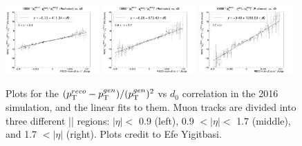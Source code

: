 \begin{figure}[!htb]
      \centering
      \captionsetup{justification=justified}
      \includegraphics[width=0.32\textwidth]{pics/muon_corr/GeoFit/fit_results/2016_DY_eta_0_0p9_dRelPt2p0_Roch.png}
      \includegraphics[width=0.32\textwidth]{pics/muon_corr/GeoFit/fit_results/2016_DY_eta_0p9_1p7_dRelPt2p0_Roch.png}
      \includegraphics[width=0.32\textwidth]{pics/muon_corr/GeoFit/fit_results/2016_DY_eta_1p7_inf_dRelPt2p0_Roch.png}
      \caption{Plots for the $(p_{\mathrm{T}}^{reco}-p_{\mathrm{T}}^{gen})/ (p_{\mathrm{T}}^{gen})^{2}$ vs $d_0$ correlation in the 2016 \DY simulation, 
               and the linear fits to them. Muon tracks are divided into three different |\eta| regions:
               $|\eta| <$ 0.9 (left), 0.9 $< |\eta| <$ 1.7 (middle), and 1.7 $< |\eta|$ (right).
               Plots credit to Efe Yigitbasi.}
      \label{fig:geofit_param_2016}
\end{figure}

